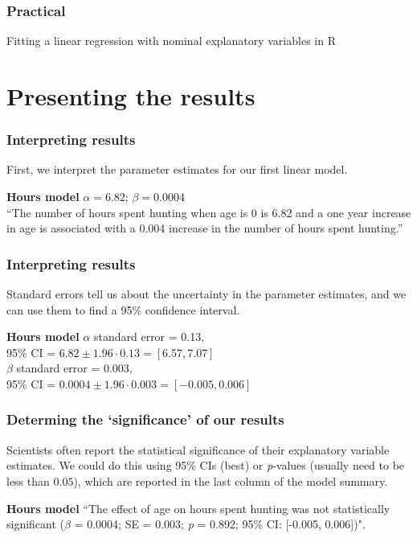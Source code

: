 \documentclass{beamer}
\begin{document}
\begin{frame}
  \frametitle{Practical}
  Fitting a linear regression with nominal explanatory variables in R
\end{frame}
\section{Presenting the results}
\begin{frame}
  \frametitle{Interpreting results}
  First, we interpret the parameter estimates for our first linear model. \\ \vspace{1cm}
  \begin{block}{\textbf{Hours model}}
    $\alpha = 6.82$; $\beta = 0.0004$ \\ \vspace{0.5cm}
   ``The number of hours spent hunting when age is 0 is 6.82 and a one year increase in age is associated with a 0.004 increase in the number of hours spent hunting.''
 \end{block}
\end{frame}
\begin{frame}
  \frametitle{Interpreting results}
  Standard errors tell us about the uncertainty in the parameter estimates,
  and we can use them to find a 95\% confidence interval. \\ \vspace{1cm}
  \begin{block}{\textbf{Hours model}}
    $\alpha$ standard error = 0.13, \\95\% CI = $6.82 \pm 1.96 \cdot 0.13 = [6.57, 7.07]$ \\ \vspace{0.5cm}
    $\beta$ standard error = 0.003,\\ 95\% CI = $0.0004 \pm 1.96 \cdot 0.003 = [-0.005, 0.006]$
 \end{block}
\end{frame}
\begin{frame}
  \frametitle{Determing the `significance' of our results}
  Scientists often report the statistical significance of their explanatory variable estimates.
  We could do this using 95\% CIs (best) or \textit{p}-values (usually need to be less than $0.05$),
  which are reported in the last column of the model summary. \\ \vspace{1cm}

  \begin{block}{\textbf{Hours model}}
   ``The effect of age on hours spent hunting was not statistically significant ($\beta$ = 0.0004; SE = 0.003; \textit{p} = 0.892; 95\% CI: [-0.005, 0.006])".
 \end{block}
\end{frame}
\end{document}
